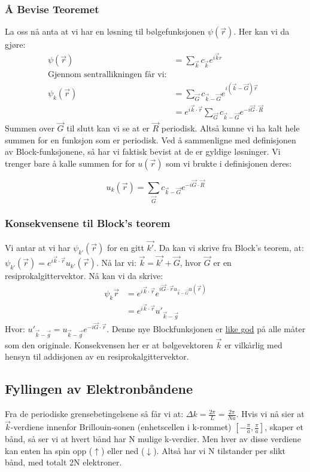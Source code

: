 \documentclass{article}
\begin{document}
\subsubsection{Å Bevise Teoremet}
La oss nå anta at vi har en løsning til bølgefunksjonen $\psi(\vec{r})$.
Her kan vi da gjøre:
\begin{align*}
  \psi(\vec{r}) &= \sum_{\vec{k}} c_{\vec{k}} e^{i \vec{k} {r}} \\
  \text{Gjennom sentrallikningen får vi:} \\
   \psi_k(\vec{r})&= \sum_{\vec{G}} c_{\vec{k} - \vec{G}} e^{i(\vec{k} - \vec{G}) 
   \vec{r}} \\
   &= e^{i\vec{k}\cdot\vec{r}} \sum_{\vec{G}}  c_{\vec{k} - \vec{G}}e^{-i \vec{G}\cdot\vec{R}}
\end{align*}
Summen over $\vec{G}$ til slutt kan vi se at er $\vec{R}$ periodisk. Altså kunne vi ha kalt hele summen for en funksjon som er periodisk. Ved å sammenligne med definisjonen av Block-funksjonene, så har vi faktisk bevist at de er gyldige løsninger. Vi trenger bare å kalle summen for for $u(\vec{r})$ som vi brukte i definisjonen deres: 

\begin{equation*}
  u_k(\vec{r}) = \sum_{\vec{G}} c_{\vec{k} - \vec{G}} e^{-i \vec{G} \cdot \vec{R}}
\end{equation*}
\subsubsection{Konsekvensene til Block's teorem}
Vi antar at vi har $\psi_{k'}(\vec{r})$ for en gitt $\vec{k'}$. Da kan vi skrive fra Block's teorem, at: $\psi_{k'}(\vec{r}) = e^{i\vec{k}\cdot\vec{r}} u_{k'}(\vec{r})$. Nå lar vi: $\vec{k} = \vec{k'} + \vec{G}$, hvor $\vec{G}$ er en resiprokalgittervektor. Nå kan vi da skrive:
\begin{align*}
  \psi_k{\vec{r}} &= e^{i \vec{k} \cdot \vec{r}} e^{i \vec{G} \cdot \vec{r} u_{\vec{k} - \vec{G}}u(\vec{r})} \\
  &= e^{i\vec{k}\cdot\vec{r}}{u'}_{\vec{k}-\vec{g}}
\end{align*}
Hvor: ${u'}_{\vec{k}-\vec{g}} = {u}_{\vec{k}-\vec{g}} e^{-i \vec{G}\cdot \vec{r}}$.
Denne nye Blockfunksjonen er \underline{like god} på alle måter som den originale. Konsekvensen her er at bølgevektoren $\vec{k}$ er vilkårlig med hensyn til addisjonen av en resiprokalgittervektor.

\subsection{Fyllingen av Elektronbåndene}
Fra de periodiske grensebetingelsene så får vi at: $\Delta k = \frac{2\pi}{L} = \frac{2\pi}{Na}$. Hvis vi nå sier at $\vec{k}$-verdiene innenfor  Brillouin-sonen (enhetscellen i k-rommet) $\left[-\frac{\pi}{a}, \frac{\pi}{a} \right]$, skaper et bånd, så ser vi at hvert bånd har N mulige k-verdier. Men hver av disse verdiene kan enten ha spin opp ($\uparrow$) eller ned ($\downarrow$). Altså har vi N tilstander per slikt bånd, med totalt 2N elektroner.
\end{document}
